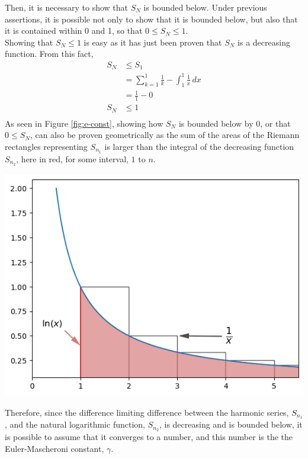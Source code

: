\documentclass[titlepage,12 pt]{article}
\begin{document}
Then, it is necessary to show that $S_N$ is bounded below. Under previous assertions, it is possible not only to show that it is bounded below, but also that it is contained within 0 and 1, so that $0 \leq S_N \leq 1$. \\ 
Showing that $S_N \leq 1$ is easy as it has just been proven that $S_N$ is a decreasing function. From this fact, 
\begin{align*}
    S_N &\leq S_1 \\[3 mm]
    &= \sum_{k=1}^{1} \frac{1}{k} - \int_{1}^{1}\frac{1}{x} \,dx \\[3 mm]
    &= \frac{1}{1} - 0 \\[3 mm]
    S_N &\leq 1 \\
\end{align*}
As seen in Figure \ref{fig:e-const}, showing how $S_N$ is bounded below by 0, or that $0 \leq S_N$, can also be proven geometrically as the sum of the areas of the Riemann rectangles representing $S_{n_1}$ is larger than the integral of the decreasing function $S_{n_2}$, here in red, for some interval, $1$ to $n$.
\begin{center}
\includegraphics[scale=0.6]{rendered/euler_constant.png}
\label{fig:e-const}
\end{center}
Therefore, since the difference limiting difference between the harmonic series, $S_{n_1}$, and the natural logarithmic function,  $S_{n_2}$, is decreasing and is bounded below, it is possible to assume that it converges to a number, and this number is the the Euler-Mascheroni constant, $\gamma$.
\end{document}
